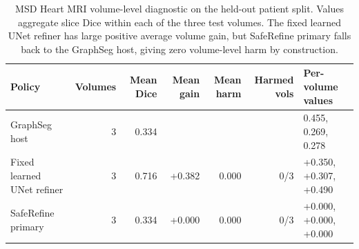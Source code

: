 \begin{table}[t]
\centering
\caption{MSD Heart MRI volume-level diagnostic on the held-out patient split. Values aggregate slice Dice within each of the three test volumes. The fixed learned UNet refiner has large positive average volume gain, but SafeRefine primary falls back to the GraphSeg host, giving zero volume-level harm by construction.}
\label{tab:mri_volume_diagnostic}
\begin{tabular}{lrrrrrl}
\toprule
Policy & Volumes & Mean Dice & Mean gain & Mean harm & Harmed vols & Per-volume values \\
\midrule
GraphSeg host & 3 & 0.334 &  &  &  & 0.455, 0.269, 0.278 \\
Fixed learned UNet refiner & 3 & 0.716 & +0.382 & 0.000 & 0/3 & +0.350, +0.307, +0.490 \\
SafeRefine primary & 3 & 0.334 & +0.000 & 0.000 & 0/3 & +0.000, +0.000, +0.000 \\
\bottomrule
\end{tabular}
\end{table}
